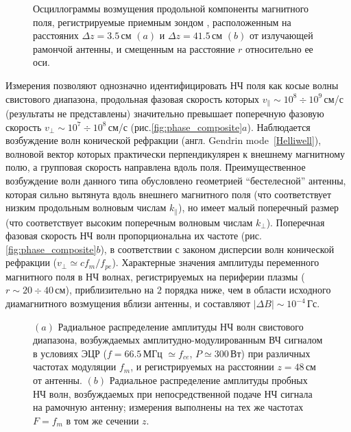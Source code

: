 \documentclass[autoref,10pt]{disser}
\begin{document}
\begin{figure}[H]
  \centering
  \def\svgwidth{0.6\columnwidth} %
  
  \caption{Осциллограммы возмущения продольной компоненты магнитного поля, регистрируемые приемным зондом , расположенным на расстояних $\Delta{}z=3.5$\,см $(a)$ и $\Delta{}z=41.5$\,см $(b)$ от излучающей рамончой  антенны, и смещенным на расстояние $r$ относительно ее оси.}
  \label{fig:picLF2+LF4}
\end{figure} 

Измерения позволяют однозначно идентифицировать НЧ поля как косые волны свистового диапазона, продольная фазовая скорость которых $v_{\parallel}\sim 10^8 \div 10^9$\,см/с (результаты не представлены) значительно превышает поперечную фазовую скорость $v_{\perp}\sim 10^7 \div 10^8$\,см/с (\mbox{рис.\ref{fig:phase_composite}$a$}). Наблюдается возбуждение волн конической рефракции (англ. Gendrin mode~\ref{Helliwell}), волновой вектор которых практически перпендикулярен к внешнему магнитному полю, а групповая скорость направлена вдоль поля. Преимущественное возбуждение волн данного типа обусловлено геометрией ``бестелесной'' антенны, которая сильно вытянута вдоль внешнего магнитного поля (что соответствует низким продольным волновым числам $k_{\parallel}$), но имеет малый поперечный размер (что соответствует высоким поперечным волновым числам $k_{\perp}$). Поперечная фазовая скорость НЧ волн пропорциональна их частоте (\mbox{рис.\ref{fig:phase_composite}$b$)}, в соответствии с законом дисперсии волн конической рефракции ($v_{\perp}\simeq c f_m/f_{pe}$). Характерные значения амплитуды переменного магнитного поля в НЧ волнах, регистрируемых на периферии плазмы ($r\sim 20\div 40$\,см), приблизительно на $2$ порядка ниже, чем в области исходного диамагнитного возмущения вблизи антенны, и составляют $|\Delta B|\sim 10^{-4}$\,Гс.

\begin{figure}[H]
  \centering
  \def\svgwidth{0.6\columnwidth} %
  
  \vspace{0.7cm}
  \caption{$(a)$ Радиальное распределение амплитуды НЧ волн свистового диапазона, возбуждаемых амплитудно-модулированным ВЧ сигналом в условиях ЭЦР ($f=66.5$\,МГц $\simeq f_{ce}$, $P\simeq 300$\,Вт) при различных частотах модуляции $f_{m}$, и регистрируемых на расстоянии $z=48$\,см от антенны. $(b)$ Радиальное распределение амплитуды пробных НЧ волн, возбуждаемых при непосредственной подаче НЧ сигнала на рамочную антенну; измерения выполнены на тех же частотах $F=f_m$ в том же сечении $z$.}
  \label{fig:param_vs_dir}
\end{figure} 
 
\end{document}
